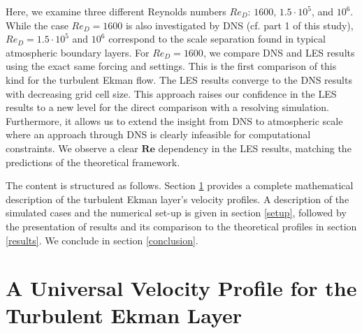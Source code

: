 \documentclass[draft,a4paper,11pt]{article}
\newcommand{\RE}{\mathbf{Re}}
\begin{document}
Here, we examine three different Reynolds numbers $Re_D$: $1600$, $1.5\cdot10^5$, and $10^6$. While the case $Re_D=1600$ is also investigated by DNS (cf. part 1 of this study), $Re_D=1.5 \cdot 10^5$ and $10^6$ correspond to the scale separation found in typical atmospheric boundary layers. For $Re_D=1600$, we compare DNS and LES results using the exact same forcing and settings. This is the first comparison of this kind for the turbulent Ekman flow. The LES results converge to the DNS results with decreasing grid cell size. This approach raises our confidence in the LES results to a new level for the direct comparison with a resolving simulation. Furthermore, it allows us to extend the insight from DNS to atmospheric scale where an approach through DNS is clearly infeasible for computational constraints. We observe a clear $\RE$ dependency in the LES results, matching the predictions of the theoretical framework.

The content is structured as follows. Section \ref{universal_profile} provides a complete mathematical description of the turbulent Ekman layer's velocity profiles. A description of the simulated cases and the numerical set-up is given in section \ref{setup}, followed by the presentation of results and its comparison to the theoretical profiles in section \ref{results}. We conclude in section \ref{conclusion}.

\section{A Universal Velocity Profile for the Turbulent Ekman Layer}
\label{universal_profile}
\end{document}
